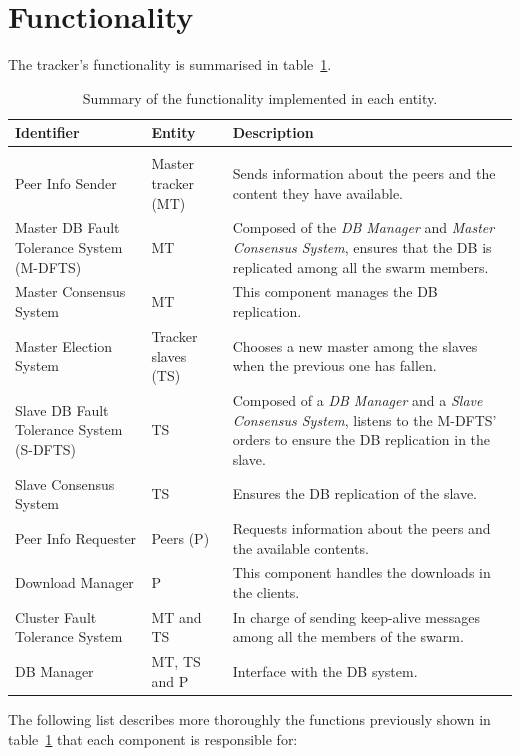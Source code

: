 \documentclass[twoside,a4paper,10pt]{article}
\begin{document}
\section{Functionality}

The tracker's functionality is summarised in table~\ref{tab:fun-entities}.

\begin{table}
  \centering
  \begin{tabularx}{\linewidth}{l l X}
    Identifier & Entity & Description \\ \hline\hline \\
    Peer Info Sender & Master tracker (MT) & Sends information about the peers and
    the content they have available. \\
    Master DB Fault Tolerance System (M-DFTS) & MT & Composed of the
    \emph{DB Manager} and \emph{Master Consensus System}, ensures that the
    DB is replicated among all the swarm members.\\
    Master Consensus System & MT & This component manages the DB
    replication.\\
    Master Election System & Tracker slaves (TS) & Chooses a new master among the
    slaves when the previous one has fallen.\\
    Slave DB Fault Tolerance System (S-DFTS) & TS & Composed of a
    \emph{DB Manager} and a \emph{Slave Consensus System}, listens to the
    M-DFTS' orders to ensure the DB replication in the slave.\\
    Slave Consensus System & TS &  Ensures the DB replication of
    the slave.\\
    Peer Info Requester & Peers (P) & Requests information about the peers and the
    available contents.\\
    Download Manager & P & This component handles the downloads in the
    clients.\\
    Cluster Fault Tolerance System & MT and TS &
    In charge of sending keep-alive messages among all the members of the
    swarm.\\
    DB Manager & MT, TS and P & Interface with the
    DB system.\\
  \end{tabularx}
  \caption{\label{tab:fun-entities}Summary of the functionality
    implemented in each entity.}
\end{table}

The following list describes more thoroughly the functions previously shown in
table~\ref{tab:fun-entities} that each component is responsible for:
\end{document}
